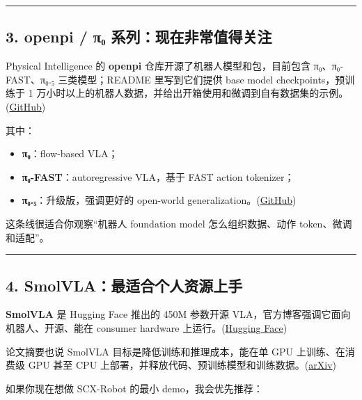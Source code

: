 \documentclass[
  12pt,
]{ctexart}
\providecommand{\tightlist}{%
  \setlength{\itemsep}{0pt}\setlength{\parskip}{0pt}}
\begin{document}
\begin{center}\rule{0.5\linewidth}{0.5pt}\end{center}

\subsection{3. openpi / π₀
系列：现在非常值得关注}\label{openpi-ux3c0ux2080-ux7cfbux5217ux73b0ux5728ux975eux5e38ux503cux5f97ux5173ux6ce8}

Physical Intelligence 的 \textbf{openpi}
仓库开源了机器人模型和包，目前包含 π₀、π₀-FAST、π₀.₅ 三类模型；README
里写到它们提供 base model checkpoints，预训练于 1
万小时以上的机器人数据，并给出开箱使用和微调到自有数据集的示例。(\href{https://www.wwpdb.org/?utm_source=chatgpt.com}{GitHub})

其中：

\begin{itemize}
\tightlist
\item
  \textbf{π₀}：flow-based VLA；
\item
  \textbf{π₀-FAST}：autoregressive VLA，基于 FAST action tokenizer；
\item
  \textbf{π₀.₅}：升级版，强调更好的 open-world
  generalization。(\href{https://www.wwpdb.org/?utm_source=chatgpt.com}{GitHub})
\end{itemize}

这条线很适合你观察``机器人 foundation model 怎么组织数据、动作
token、微调和适配''。

\begin{center}\rule{0.5\linewidth}{0.5pt}\end{center}

\subsection{4.
SmolVLA：最适合个人资源上手}\label{smolvlaux6700ux9002ux5408ux4e2aux4ebaux8d44ux6e90ux4e0aux624b}

\textbf{SmolVLA} 是 Hugging Face 推出的 450M 参数开源
VLA，官方博客强调它面向机器人、开源、能在 consumer hardware
上运行。(\href{https://openreview.net/forum?id=dh_MkX0QfrK&utm_source=chatgpt.com}{Hugging
Face})

论文摘要也说 SmolVLA 目标是降低训练和推理成本，能在单 GPU
上训练、在消费级 GPU 甚至 CPU
上部署，并释放代码、预训练模型和训练数据。(\href{https://www.nist.gov/ambench?utm_source=chatgpt.com}{arXiv})

如果你现在想做 SCX-Robot 的最小 demo，我会优先推荐：
\end{document}
